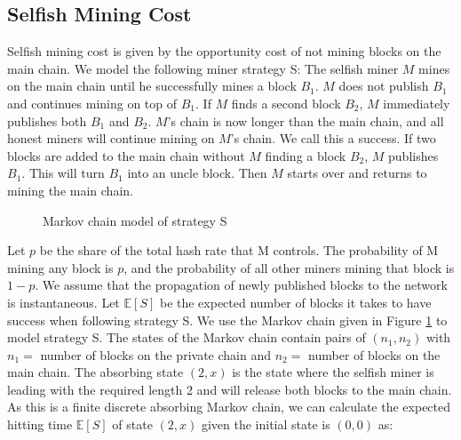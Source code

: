 \documentclass[conference]{IEEEtran}
\begin{document}
\subsection{Selfish Mining Cost\label{sectionSelfishMining}}
Selfish mining cost is given by the opportunity cost of not mining blocks on the main chain. We model the following miner strategy S:
The selfish miner $M$ mines on the main chain until he successfully mines a block $B_{1}$. $M$ does not publish $B_{1}$ and continues mining on top of $B_{1}$.
If $M$ finds a second block $B_{2}$, $M$ immediately publishes both $B_{1}$ and $B_{2}$. $M$'s chain is now longer than the main chain, and all honest miners will continue mining on $M$'s chain. We call this a success. If two blocks are added to the main chain without $M$ finding a block $B_{2}$, $M$ publishes $B_{1}$. This will turn $B_{1}$ into an uncle block. Then $M$ starts over and returns to mining the main chain.

\begin{figure}[h!]
\centering
{}
\caption{Markov chain model of strategy S}
\label{MarkovFull}
\end{figure}

Let $p$ be the share of the total hash rate that M controls. The probability of M mining any block is $p$, and the probability of all other miners mining that block is $1-p$. We assume that the propagation of newly published blocks to the network is instantaneous. Let $\mathbb{E}[S]$ be the expected number of blocks it takes to have success when following strategy S. We use the Markov chain given in Figure \ref{MarkovFull} to model strategy S. The states of the Markov chain contain pairs of $(n_1,n_2)$ with $n_1=$ number of blocks on the private chain and $n_2=$ number of blocks on the main chain. The absorbing state $(2,x)$ is the state where the selfish miner is leading with the required length 2 and will release both blocks to the main chain. As this is a finite discrete absorbing Markov chain, we can calculate the expected hitting time $\mathbb{E}[S]$ of state $(2,x)$ given the initial state is $(0,0)$ as:
\end{document}
